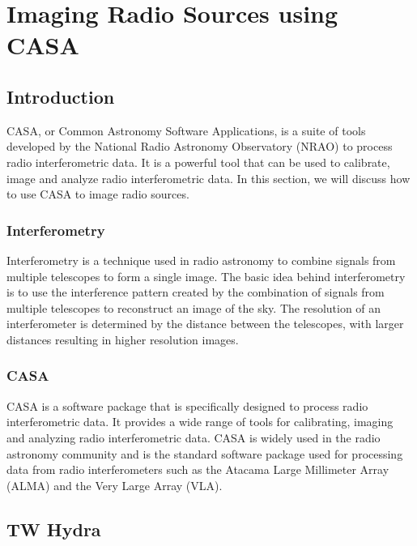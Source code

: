 \chapter{Imaging Radio Sources using CASA}

\section{Introduction}

CASA, or Common Astronomy Software Applications, is a suite of tools developed by the National Radio Astronomy Observatory (NRAO) to process radio interferometric data. It is a powerful tool that can be used to calibrate, image and analyze radio interferometric data. In this section, we will discuss how to use CASA to image radio sources.


\subsection{Interferometry}

Interferometry is a technique used in radio astronomy to combine signals from multiple telescopes to form a single image. The basic idea behind interferometry is to use the interference pattern created by the combination of signals from multiple telescopes to reconstruct an image of the sky. The resolution of an interferometer is determined by the distance between the telescopes, with larger distances resulting in higher resolution images.


\subsection{CASA}

CASA is a software package that is specifically designed to process radio interferometric data. It provides a wide range of tools for calibrating, imaging and analyzing radio interferometric data. CASA is widely used in the radio astronomy community and is the standard software package used for processing data from radio interferometers such as the Atacama Large Millimeter Array (ALMA) and the Very Large Array (VLA).

\clearpage

\section{TW Hydra}

